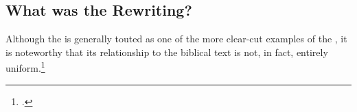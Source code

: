 \subsection{What was the \ga Rewriting?}

Although the \ga is generally touted as one of the more clear-cut examples of the \rwb, it is noteworthy that its relationship to the biblical text is not, in fact, entirely uniform.\footnote{\cite[333]{bernstein_berthelot-etal2010}.}



